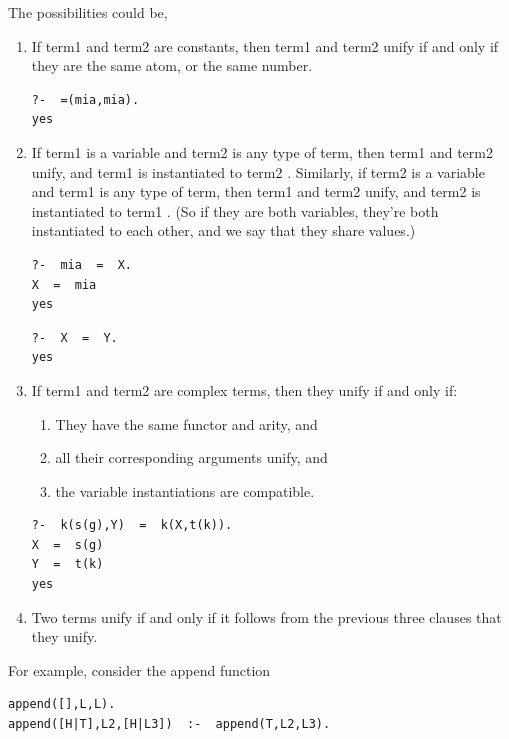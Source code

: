 \documentclass[proposal.tex]{subfiles}
\begin{document}
The possibilities could be,
\begin{enumerate}
\item If term1 and term2 are constants, then term1 and term2 unify if and only if they are the same atom, or the same number.
\begin{verbatim}
?-  =(mia,mia).
yes
\end{verbatim}

\item If term1 is a variable and term2 is any type of term, then term1 and term2 unify, and term1 is instantiated to term2 . Similarly, if 
term2 is a variable and term1 is any type of term, then term1 and term2 unify, and term2 is instantiated to term1 . (So if they are both 
variables, they’re both instantiated to each other, and we say that they share values.)
\begin{verbatim}
?-  mia  =  X.
X  =  mia 
yes
\end{verbatim}

\begin{verbatim}
?-  X  =  Y. 
yes
\end{verbatim}

\item If term1 and term2 are complex terms, then they unify if and only if:

\begin{enumerate}
\item They have the same functor and arity, and

\item all their corresponding arguments unify, and

\item the variable instantiations are compatible.
\end{enumerate}
\begin{verbatim}
?-  k(s(g),Y)  =  k(X,t(k)).
X  =  s(g) 
Y  =  t(k) 
yes
\end{verbatim}


\item Two terms unify if and only if it follows from the previous three clauses that they unify.
\end{enumerate} 

\newpage

For example, consider the append function 

\begin{verbatim}
append([],L,L). 
append([H|T],L2,[H|L3])  :-  append(T,L2,L3).
\end{verbatim}
\end{document}
